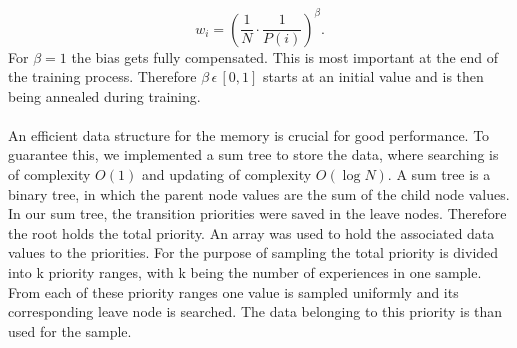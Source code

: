 \begin{equation}
w_{i}=\left(\frac{1}{N} \cdot \frac{1}{P(i)}\right)^{\beta}.
\end{equation}
For $\beta=1$ the bias gets fully compensated. This is most important at the end of the training process. Therefore $\beta\,\epsilon\,[0,1]$ starts at an initial value and is then being annealed during training. \\\\
An efficient data structure for the memory is crucial for good performance.
To guarantee this, we implemented a sum tree to store the data, where searching is of complexity $O(1)$ and updating of complexity $O(\log N)$.
A sum tree is a binary tree, in which the parent node values are the sum of the child node values. In our sum tree, the transition priorities were saved in the leave nodes. Therefore the root holds the total priority. An array was used to hold the associated data values to the priorities. For the purpose of sampling the total priority is divided into k priority ranges, with k being the number of experiences in one sample.
From each of these priority ranges one value is sampled uniformly and its corresponding leave node is searched. The data belonging to this priority is than used for the sample.

